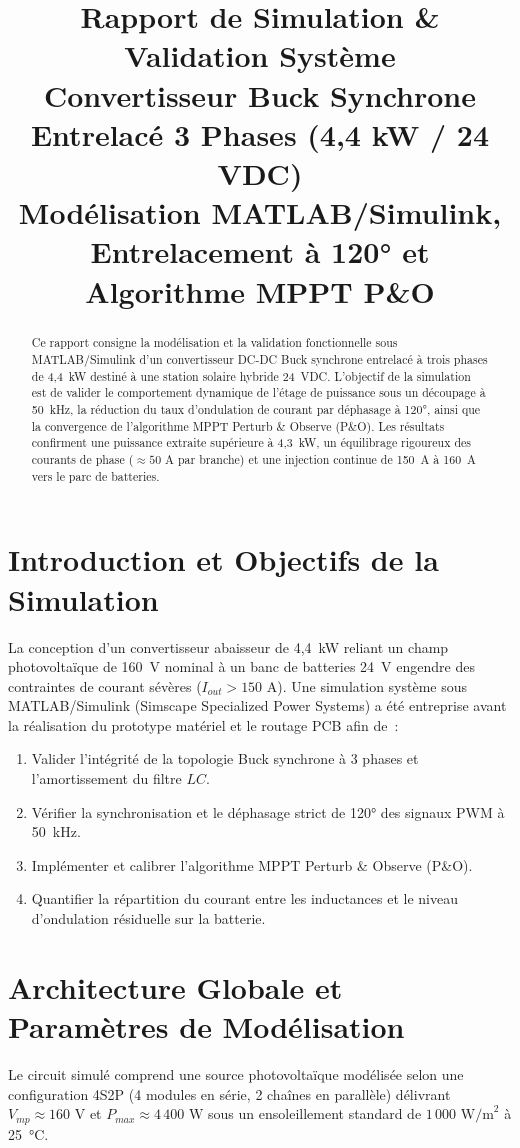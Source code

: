 \documentclass[11pt, a4paper]{article}
\title{\textbf{\LARGE Rapport de Simulation \& Validation Système}\\[0.3cm]
\Large Convertisseur Buck Synchrone Entrelacé 3 Phases (4,4 kW / 24 VDC)\\[0.2cm]
\large Modélisation MATLAB/Simulink, Entrelacement à 120° et Algorithme MPPT P\&O}
\author{}
\date{}
\begin{document}
\maketitle

\begin{abstract}
Ce rapport consigne la modélisation et la validation fonctionnelle sous MATLAB/Simulink d'un convertisseur DC-DC Buck synchrone entrelacé à trois phases de 4,4~kW destiné à une station solaire hybride 24~VDC. L'objectif de la simulation est de valider le comportement dynamique de l'étage de puissance sous un découpage à 50~kHz, la réduction du taux d'ondulation de courant par déphasage à 120°, ainsi que la convergence de l'algorithme MPPT Perturb \& Observe (P\&O). Les résultats confirment une puissance extraite supérieure à 4,3~kW, un équilibrage rigoureux des courants de phase ($\approx 50\text{ A}$ par branche) et une injection continue de 150~A à 160~A vers le parc de batteries.
\end{abstract}

\vspace{0.5cm}

\section{Introduction et Objectifs de la Simulation}
La conception d'un convertisseur abaisseur de 4,4~kW reliant un champ photovoltaïque de 160~V nominal à un banc de batteries 24~V engendre des contraintes de courant sévères ($I_{out} > 150\text{ A}$). Une simulation système sous MATLAB/Simulink (Simscape Specialized Power Systems) a été entreprise avant la réalisation du prototype matériel et le routage PCB afin de~:
\begin{enumerate}
    \item Valider l'intégrité de la topologie Buck synchrone à 3 phases et l'amortissement du filtre $LC$.
    \item Vérifier la synchronisation et le déphasage strict de 120° des signaux PWM à 50~kHz.
    \item Implémenter et calibrer l'algorithme MPPT Perturb \& Observe (P\&O).
    \item Quantifier la répartition du courant entre les inductances et le niveau d'ondulation résiduelle sur la batterie.
\end{enumerate}

\section{Architecture Globale et Paramètres de Modélisation}
Le circuit simulé comprend une source photovoltaïque modélisée selon une configuration 4S2P (4 modules en série, 2 chaînes en parallèle) délivrant $V_{mp} \approx 160\text{ V}$ et $P_{max} \approx 4\,400\text{ W}$ sous un ensoleillement standard de $1\,000\text{ W/m}^2$ à 25~°C.
\end{document}
